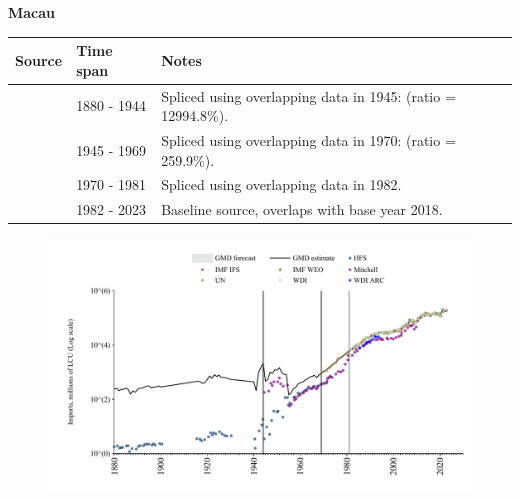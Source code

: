 \documentclass[12pt,a4paper,landscape]{article}
\begin{document}
\begin{adjustbox}{max totalsize={\paperwidth}{\paperheight},center}
\begin{minipage}[t][\textheight][t]{\textwidth}
\vspace*{0.5cm}
{}
\begin{center}
{\Large\bfseries Macau}
\end{center}
\vspace{0.5cm}
\begin{table}[H]
\centering
\small
\begin{tabular}{|l|l|l|}
\hline
\textbf{Source} & \textbf{Time span} & \textbf{Notes} \\
\hline
\rowcolor{white}\cite{HFS}& 1880 - 1944 &Spliced using overlapping data in 1945: (ratio = 12994.8\%).\\
\rowcolor{lightgray}\cite{Mitchell}& 1945 - 1969 &Spliced using overlapping data in 1970: (ratio = 259.9\%).\\
\rowcolor{white}\cite{UN}& 1970 - 1981 &Spliced using overlapping data in 1982.\\
\rowcolor{lightgray}\cite{WDI}& 1982 - 2023 &Baseline source, overlaps with base year 2018.\\
\hline
\end{tabular}
\end{table}
\begin{figure}[H]
\centering
\includegraphics[width=\textwidth,height=0.6\textheight,keepaspectratio]{graphs/MAC_imports.pdf}
\end{figure}
\end{minipage}
\end{adjustbox}
\end{document}

